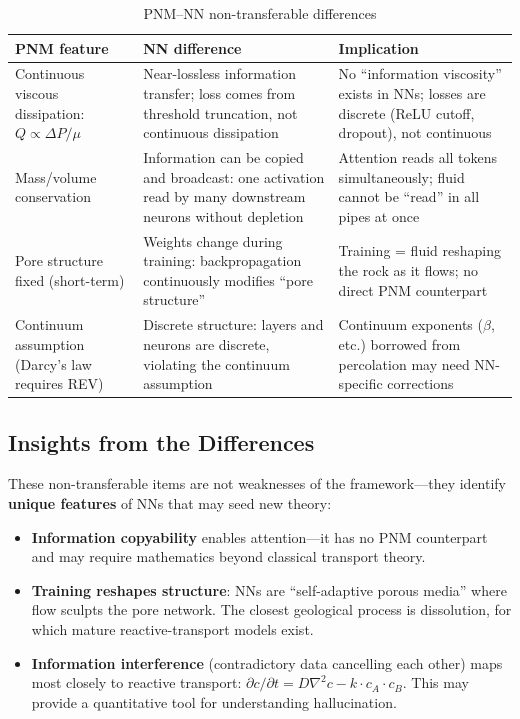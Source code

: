 \documentclass[11pt,a4paper]{article}
\begin{document}
\begin{table}[H]
\centering
\caption{PNM--NN non-transferable differences}
\small
\begin{tabular}{p{3.2cm}p{3.2cm}p{5.5cm}}
\toprule
\textbf{PNM feature} & \textbf{NN difference} & \textbf{Implication} \\
\midrule
Continuous viscous dissipation: $Q\propto\Delta P/\mu$ & Near-lossless information transfer; loss comes from threshold truncation, not continuous dissipation & No ``information viscosity'' exists in NNs; losses are discrete (ReLU cutoff, dropout), not continuous \\
\addlinespace
Mass/volume conservation & Information can be copied and broadcast: one activation read by many downstream neurons without depletion & Attention reads all tokens simultaneously; fluid cannot be ``read'' in all pipes at once \\
\addlinespace
Pore structure fixed (short-term) & Weights change during training: backpropagation continuously modifies ``pore structure'' & Training = fluid reshaping the rock as it flows; no direct PNM counterpart \\
\addlinespace
Continuum assumption (Darcy's law requires REV) & Discrete structure: layers and neurons are discrete, violating the continuum assumption & Continuum exponents ($\beta$, etc.) borrowed from percolation may need NN-specific corrections \\
\bottomrule
\end{tabular}
\end{table}

\subsection{Insights from the Differences}

These non-transferable items are not weaknesses of the framework---they identify \textbf{unique features} of NNs that may seed new theory:

\begin{itemize}[nosep]
  \item \textbf{Information copyability} enables attention---it has no PNM counterpart and may require mathematics beyond classical transport theory.
  \item \textbf{Training reshapes structure}: NNs are ``self-adaptive porous media'' where flow sculpts the pore network. The closest geological process is dissolution, for which mature reactive-transport models exist.
  \item \textbf{Information interference} (contradictory data cancelling each other) maps most closely to reactive transport: $\partial c/\partial t = D\nabla^2 c - k\cdot c_A\cdot c_B$. This may provide a quantitative tool for understanding hallucination.
\end{itemize}
\end{document}

